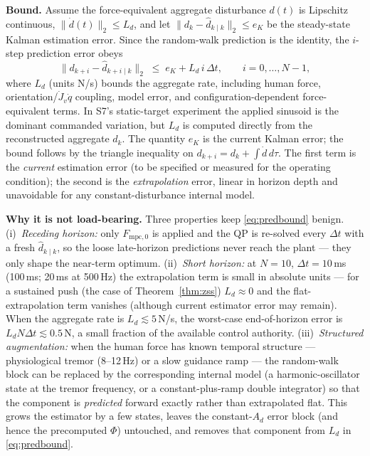 \documentclass[journal]{IEEEtran}
\newcommand{\Fmpck}[1]{F_{\text{mpc},#1}}
\newcommand{\dhat}{\hat{d}}
\begin{document}
\textbf{Bound.} Assume the force-equivalent aggregate disturbance $d(t)$ is
Lipschitz continuous,
$\|\dot{d}(t)\|_2\le L_d$, and let $\|d_k-\dhat_{k\mid k}\|_2\le e_K$ be the
steady-state Kalman estimation error. Since the random-walk prediction is the
identity, the $i$-step prediction error obeys
\begin{equation}\label{eq:predbound}
  \|d_{k+i}-\dhat_{k+i\mid k}\|_2 \;\le\; e_K + L_d\,i\,\Delta t,
  \qquad i=0,\dots,N-1,
\end{equation}
where $L_d$ (units N/s) bounds the aggregate rate, including human force,
orientation/$\dot J_v\dot q$ coupling, model error, and configuration-dependent
force-equivalent terms. In S7's static-target experiment the applied sinusoid
is the dominant commanded variation, but $L_d$ is computed directly from the
reconstructed aggregate $d_k$. The quantity $e_K$ is the current Kalman error; the bound
follows by the triangle inequality on $d_{k+i}=d_k+\int\dot{d}\,d\tau$. The
first term is the \emph{current} estimation error (to be specified or
measured for the operating condition); the second is the \emph{extrapolation}
error, linear in horizon depth and unavoidable for any constant-disturbance
internal model.

\textbf{Why it is not load-bearing.} Three properties keep
\eqref{eq:predbound} benign. (i)~\emph{Receding horizon:} only $\Fmpck{0}$ is
applied and the QP is re-solved every $\Delta t$ with a fresh
$\dhat_{k\mid k}$, so the loose late-horizon predictions never reach the plant
--- they only shape the near-term optimum. (ii)~\emph{Short horizon:} at
$N=10$, $\Delta t=10$\,ms (100\,ms; 20\,ms at 500\,Hz) the extrapolation term
is small in absolute units --- for a sustained push (the case of
Theorem~\ref{thm:zss}) $L_d\approx0$ and the flat-extrapolation term vanishes
(although current estimator error may remain). When the aggregate rate is
$L_d\lesssim5$\,N/s, the worst-case end-of-horizon error is
$L_d N\Delta t\lesssim0.5$\,N, a small fraction of the
available control authority. (iii)~\emph{Structured augmentation:} when the
human force has known temporal structure --- physiological tremor
(8--12\,Hz) or a slow guidance ramp --- the random-walk block can be replaced
by the corresponding internal model (a harmonic-oscillator state at the tremor
frequency, or a constant-plus-ramp double integrator) so that the component is
\emph{predicted} forward exactly rather than extrapolated flat. This grows the
estimator by a few states, leaves the constant-$A_d$ error block (and hence
the precomputed $\Phi$) untouched, and removes that component from $L_d$ in
\eqref{eq:predbound}.
\end{document}
